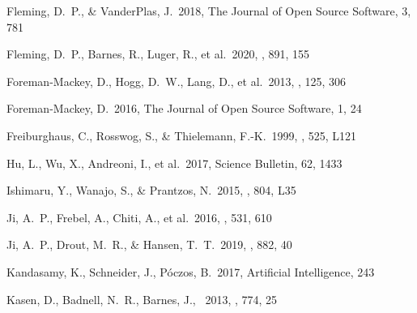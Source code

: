 \documentclass[twocolumn]{aastex63}
\begin{document}
\begin{thebibliography}{}

 Fleming, D.~P., \& VanderPlas, J.\ 2018, The Journal of Open Source Software, 3, 781

 Fleming, D.~P., Barnes, R., Luger, R., et al.\ 2020, \apj, 891, 155

 Foreman-Mackey, D., Hogg, D.~W., Lang, D., et al.\ 2013, \pasp, 125, 306

 Foreman-Mackey, D.\ 2016, The Journal of Open Source Software, 1, 24




 Freiburghaus, C., Rosswog, S., \& Thielemann, F.-K.\ 1999, \apjl, 525, L121


 Hu, L., Wu, X., Andreoni, I., et al.\ 2017, Science Bulletin, 62, 1433

 Ishimaru, Y., Wanajo, S., \& Prantzos, N.\ 2015, \apjl, 804, L35

 Ji, A.~P., Frebel, A., Chiti, A., et al.\ 2016, \nat, 531, 610

 Ji, A.~P., Drout, M.~R., \& Hansen, T.~T.\ 2019, \apj, 882, 40


 Kandasamy, K., Schneider, J., P{\'o}czos, B.\ 2017, Artificial Intelligence, 243

Kasen, D., Badnell, N.~R., Barnes, J., \ 2013, \aj, 774, 25


\end{thebibliography}
\end{document}
